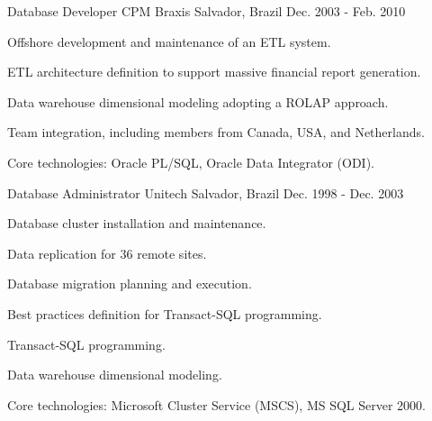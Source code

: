 \begin{cventries}
\cventry
{Database Developer} %
{CPM Braxis} %
{Salvador, Brazil} %
{Dec. 2003 - Feb. 2010} %
{ %
\begin{cvitems}
\item{Offshore development and maintenance of an ETL system.} 
\item{ETL architecture definition to support massive financial report generation.} 
\item{Data warehouse dimensional modeling adopting a ROLAP approach.}
\item{Team integration, including members from Canada, USA, and Netherlands.}
\item{Core technologies: Oracle PL/SQL, Oracle Data Integrator (ODI).}
\end{cvitems}
}


\cventry
{Database Administrator} %
{Unitech} %
{Salvador, Brazil} %
{Dec. 1998 - Dec. 2003} %
{ %
\begin{cvitems}
	\item{Database cluster installation and maintenance.}
	\item{Data replication for 36 remote sites.} 
	\item{Database migration planning and execution.}
	\item{Best practices definition for Transact-SQL programming.}
	\item{Transact-SQL programming.}
	\item{Data warehouse dimensional modeling.}
	\item{Core technologies: Microsoft Cluster Service (MSCS), MS SQL Server 2000.}
\end{cvitems}
}


\end{cventries}